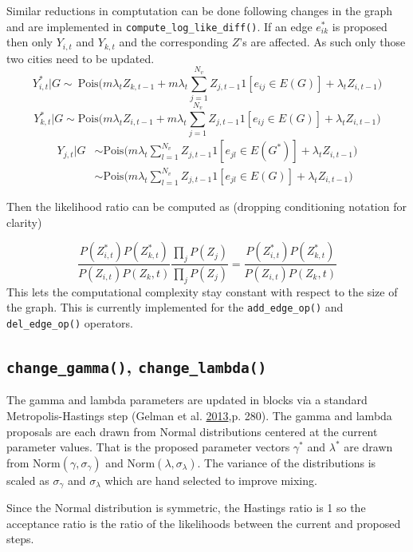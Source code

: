 \documentclass[11pt,a4paper]{article}
\begin{document}
Similar reductions in comptutation can be done following changes in the
graph and are implemented in \texttt{compute\_log\_like\_diff()}. If an
edge \(e^*_{ik}\) is proposed then only \(Y_{i,t}\) and \(Y_{k,t}\) and
the corresponding \(Z\)'s are affected. As such only those two cities
need to be updated.
\[Y^*_{i,t}|G \sim ~ \text{Pois}\big(m\lambda_tZ_{k,t-1} +m\lambda_t\sum_{j=1}^{N_v}Z_{j,t-1}1[e_{ij}\in E(G)]+ \lambda_tZ_{i,t-1}\big) \]
\[Y^*_{k,t}|G \sim  \text{Pois}\big(m\lambda_tZ_{i,t-1} +m\lambda_t\sum_{j=1}^{N_v}Z_{j,t-1}1[e_{ij}\in E(G)]+ \lambda_tZ_{i,t-1}\big) \]
\[\begin{aligned} Y_{j,t}|G &\sim \text{Pois}\big(m\lambda_t\sum_{l=1}^{N_v}Z_{j,t-1}1[e_{jl}\in E(G^*)]+ \lambda_tZ_{i,t-1}\big)\\ & \sim  \text{Pois}\big(m\lambda_t\sum_{l=1}^{N_v}Z_{j,t-1}1[e_{jl}\in E(G)]+ \lambda_tZ_{i,t-1}\big) \end{aligned}\]

Then the likelihood ratio can be computed as (dropping conditioning
notation for clarity)

\[ \frac{P(Z^*_{i,t})P(Z^*_{k,t})}{P(Z_{i,t})P(Z_k,t)}\frac{\prod_j P(Z_{j})}{\prod_{j}P( Z_{j})} = \frac{P(Z^*_{i,t})P(Z^*_{k,t})}{P(Z_{i,t})P(Z_k,t)} \]
This lets the computational complexity stay constant with respect to the
size of the graph. This is currently implemented for the
\texttt{add\_edge\_op()} and \texttt{del\_edge\_op()} operators.

\hypertarget{change_gamma-change_lambda}{%
\subsection{\texorpdfstring{\texttt{change\_gamma()},
\texttt{change\_lambda()}}{change\_gamma(), change\_lambda()}}\label{change_gamma-change_lambda}}

The gamma and lambda parameters are updated in blocks via a standard
Metropolis-Hastings step (Gelman et al.
\protect\hyperlink{ref-gelman_bayesian_2013}{2013},p. 280). The gamma
and lambda proposals are each drawn from Normal distributions centered
at the current parameter values. That is the proposed parameter vectors
\(\gamma^*\) and \(\lambda^*\) are drawn from
\(\text{Norm}(\gamma, \sigma_\gamma)\) and
\(\text{Norm}(\lambda, \sigma_\lambda)\). The variance of the
distributions is scaled as \(\sigma_\gamma\) and \(\sigma_\lambda\)
which are hand selected to improve mixing.

Since the Normal distribution is symmetric, the Hastings ratio is 1 so
the acceptance ratio is the ratio of the likelihoods between the current
and proposed steps.
\end{document}
